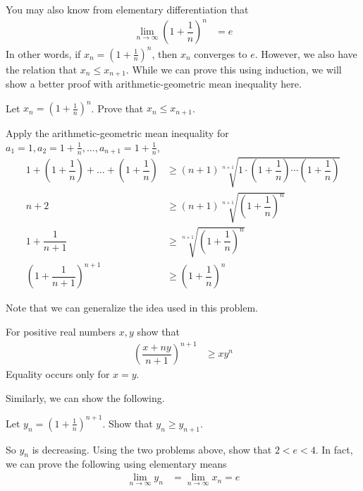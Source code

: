 \documentclass{subfile}
\begin{document}
	You may also know from elementary differentiation that
		\begin{align*}
			\lim\limits_{n\to\infty}\left(1+\dfrac{1}{n}\right)^n
				& = e
		\end{align*}
	In other words, if $x_n=\left(1+\frac{1}{n}\right)^n$, then $x_n$ converges to $e$. However, we also have the relation that $x_n\leq x_{n+1}$. While we can prove this using induction, we will show a better proof with arithmetic-geometric mean inequality here.
		\begin{problem}
			Let $x_n=\left(1+\frac{1}{n}\right)^n$. Prove that $x_n\leq x_{n+1}$.
		\end{problem}
	
		\begin{solution}
			Apply the arithmetic-geometric mean inequality for $a_1=1,a_2=1+\frac{1}{n},\ldots,a_{n+1}=1+\frac{1}{n}$,
				\begin{align*}
					1+\left(1+\dfrac{1}{n}\right)+\ldots+\left(1+\dfrac{1}{n}\right)
						& \geq(n+1)\sqrt[n+1]{1\cdot\left(1+\dfrac{1}{n}\right)\cdots\left(1+\dfrac{1}{n}\right)}\\
					n+2
						& \geq(n+1)\sqrt[n+1]{\left(1+\dfrac{1}{n}\right)^n}\\
					1+\dfrac{1}{n+1}
						& \geq\sqrt[n+1]{\left(1+\dfrac{1}{n}\right)^n}\\
					\left(1+\dfrac{1}{n+1}\right)^{n+1}
						& \geq\left(1+\dfrac{1}{n}\right)^n
				\end{align*}
		\end{solution}
	Note that we can generalize the idea used in this problem.
		\begin{problem}
			For positive real numbers $x,y$ show that
				\begin{align*}
					\left(\dfrac{x+ny}{n+1}\right)^{n+1}
						& \geq xy^n
				\end{align*}
			Equality occurs only for $x=y$.
		\end{problem}
	Similarly, we can show the following.
		\begin{problem}
			Let $y_n=\left(1+\frac{1}{n}\right)^{n+1}$. Show that $y_n\geq y_{n+1}$.
		\end{problem}
	So $y_n$ is decreasing. Using the two problems above, show that $2<e<4$. In fact, we can prove the following using elementary means
		\begin{align*}
			\lim\limits_{n\to\infty}y_n
				& = \lim\limits_{n\to\infty}x_n=e
		\end{align*}
	
\end{document}
